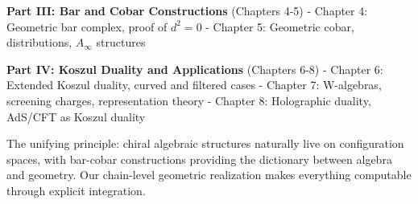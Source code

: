 \textbf{Part III: Bar and Cobar Constructions} (Chapters 4-5)
- Chapter 4: Geometric bar complex, proof of $d^2 = 0$
- Chapter 5: Geometric cobar, distributions, $A_\infty$ structures

\textbf{Part IV: Koszul Duality and Applications} (Chapters 6-8)
- Chapter 6: Extended Koszul duality, curved and filtered cases
- Chapter 7: W-algebras, screening charges, representation theory
- Chapter 8: Holographic duality, AdS/CFT as Koszul duality

The unifying principle: chiral algebraic structures naturally live on configuration spaces, with bar-cobar constructions providing the dictionary between algebra and geometry. Our chain-level geometric realization makes everything computable through explicit integration.

